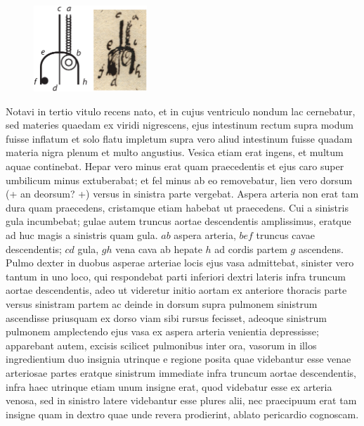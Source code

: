 \pstart%
\begin{figure}                    
\includegraphics[trim = 0mm 0mm -5mm 0mm, clip,width=0.38\textwidth]{images/lh0040104b_004r1.pdf}\\
\end{figure}%
Notavi in tertio vitulo recens nato, et in cujus ventriculo nondum lac cernebatur, sed materies quaedam ex viridi nigrescens, ejus intestinum rectum supra modum fuisse inflatum et solo flatu impletum supra vero aliud intestinum fuisse quadam materia nigra plenum et multo angustius. Vesica etiam erat ingens, et multum aquae continebat. Hepar vero minus erat quam praecedentis et ejus caro super umbilicum minus extuberabat; et fel minus ab eo removebatur, lien vero dorsum (+ an deorsum? +) versus in sinistra parte vergebat.
\pend%
\newpage
\pstart%
Aspera arteria non erat tam dura quam praecedens, cristamque etiam habebat ut praecedens. %
Cui a sinistris gula incumbebat; gulae autem truncus aortae descendentis amplissimus, eratque ad huc magis a sinistris quam gula.
\pend
\pstart
$ab$ aspera arteria, $bef$ truncus cavae descendentis; $cd$ gula, $gh$ vena cava ab hepate $h$ ad cordis partem $g$ ascendens.
\newline%
\indent%
Pulmo dexter in duobus asperae arteriae locis ejus vasa admittebat, sinister vero tantum in uno loco, qui respondebat parti inferiori dextri lateris infra truncum aortae descendentis, adeo ut videretur initio aortam ex anteriore thoracis parte versus sinistram partem ac deinde in dorsum supra pulmonem sinistrum ascendisse priusquam ex dorso viam sibi rursus fecisset, adeoque sinistrum pulmonem amplectendo ejus vasa ex aspera arteria venientia depressisse; apparebant autem, excisis scilicet pulmonibus inter ora, vasorum in illos ingredientium duo insignia utrinque
e regione posita quae videbantur esse venae arteriosae partes eratque sinistrum immediate infra truncum aortae descendentis, infra haec utrinque etiam unum insigne erat, quod videbatur esse ex arteria venosa, sed in sinistro latere videbantur esse plures alii, nec praecipuum erat tam insigne quam in dextro quae unde revera prodierint, ablato pericardio cognoscam.
